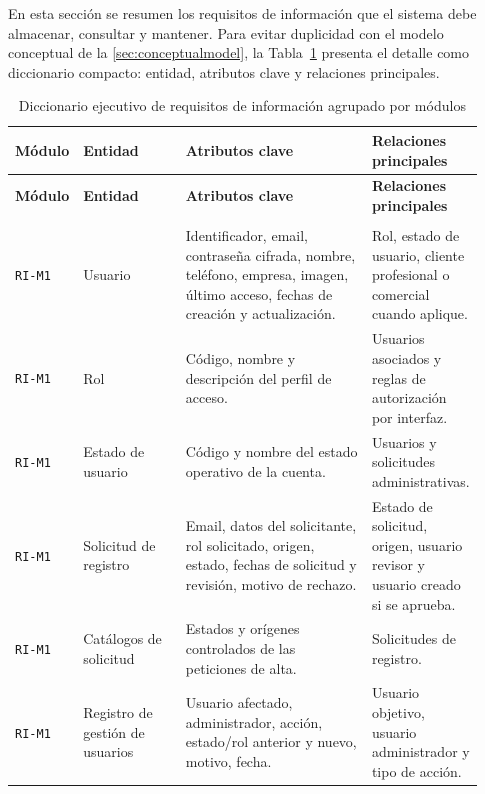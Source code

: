 En esta sección se resumen los requisitos de información que el sistema debe almacenar, consultar y mantener. Para evitar duplicidad con el modelo conceptual de la \autoref{sec:conceptualmodel}, la Tabla~\ref{tab:information-requirements-executive} presenta el detalle como diccionario compacto: entidad, atributos clave y relaciones principales.

{\scriptsize
\setlength{\tabcolsep}{3pt}
\renewcommand{\arraystretch}{1.12}
\newcommand{\RIModuleHeader}[1]{%
\hline\hline
\multicolumn{4}{|>{\RaggedRight\arraybackslash}p{0.93\linewidth}|}{\textbf{#1}}\\
\hline\hline
}
\begin{longtable}{|>{\RaggedRight\arraybackslash}p{0.08\linewidth}|>{\RaggedRight\arraybackslash}p{0.22\linewidth}|>{\RaggedRight\arraybackslash}p{0.40\linewidth}|>{\RaggedRight\arraybackslash}p{0.23\linewidth}|}
\caption{Diccionario ejecutivo de requisitos de información agrupado por módulos}
\label{tab:information-requirements-executive}\\
\hline
\textbf{Módulo} & \textbf{Entidad} & \textbf{Atributos clave} & \textbf{Relaciones principales} \\
\hline
\endfirsthead
\hline
\textbf{Módulo} & \textbf{Entidad} & \textbf{Atributos clave} & \textbf{Relaciones principales} \\
\hline
\endhead
\RIModuleHeader{M1. Acceso, usuarios y auditoría}
\texttt{RI-M1} & Usuario & Identificador, email, contraseña cifrada, nombre, teléfono, empresa, imagen, último acceso, fechas de creación y actualización. & Rol, estado de usuario, cliente profesional o comercial cuando aplique. \\
\hline
\texttt{RI-M1} & Rol & Código, nombre y descripción del perfil de acceso. & Usuarios asociados y reglas de autorización por interfaz. \\
\hline
\texttt{RI-M1} & Estado de usuario & Código y nombre del estado operativo de la cuenta. & Usuarios y solicitudes administrativas. \\
\hline
\texttt{RI-M1} & Solicitud de registro & Email, datos del solicitante, rol solicitado, origen, estado, fechas de solicitud y revisión, motivo de rechazo. & Estado de solicitud, origen, usuario revisor y usuario creado si se aprueba. \\
\hline
\texttt{RI-M1} & Catálogos de solicitud & Estados y orígenes controlados de las peticiones de alta. & Solicitudes de registro. \\
\hline
\texttt{RI-M1} & Registro de gestión de usuarios & Usuario afectado, administrador, acción, estado/rol anterior y nuevo, motivo, fecha. & Usuario objetivo, usuario administrador y tipo de acción. \\

\end{longtable}}

